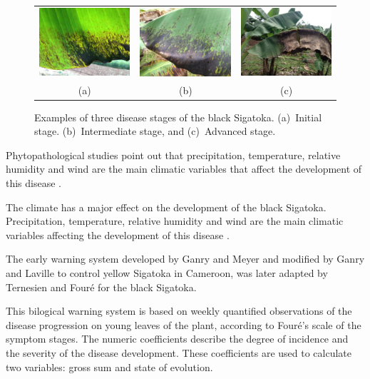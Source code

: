 \documentclass[review,authoryear,english]{elsarticle}
\begin{document}
\begin{figure}[ht] 
\centering
\begin{tabular}{c@{\;}c@{\;}c}
  \includegraphics[width=.32\linewidth]{Roya_a} &
  \includegraphics[width=.32\linewidth]{Roya_b} &
  \includegraphics[width=.32\linewidth]{Roya_c} \\
  (a) & (b) & (c) 
\end{tabular}
\caption{Examples of three disease stages of the black Sigatoka. 
(a)~Initial stage. (b)~Intermediate stage, and (c)~Advanced stage.} 
\label{fig:diseasestages} 
\end{figure}

Phytopathological studies point out that precipitation, temperature,
relative humidity and wind are the main climatic variables that affect
the development of this disease \citep{MarinVargas1995}.

The climate has a major effect on the development of the black
Sigatoka.  Precipitation, temperature, relative humidity and wind are
the main climatic variables affecting the development of this disease
\citep{MarinVargas1995}.

The early warning system developed by Ganry and Meyer
\citep{ganry1972} and modified by Ganry and Laville \citep{ganry1983}
to control yellow Sigatoka in Cameroon, was later adapted by
Ternesien \citep{Ternesien1985} and Fouré \citep{foure1988} for the
black Sigatoka.

This bilogical warning system is based on weekly quantified
observations of the disease progression on young leaves of the plant,
according to Fouré's scale of the symptom stages.
%
The numeric coefficients describe the degree of incidence and the
severity of the disease development.  These coefficients are used to
calculate two variables: gross sum and state of evolution.
\end{document}
